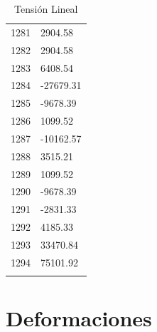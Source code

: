 \documentclass[a4paper,11pt]{article}
\begin{document}
\begin{center}
\begin{longtable}{|R{1.5cm}|R{2.5cm}|}
 1281 &      2904.58 \\
 1282 &      2904.58 \\
 1283 &      6408.54 \\
 1284 &    -27679.31 \\
 1285 &     -9678.39 \\
 1286 &      1099.52 \\
 1287 &    -10162.57 \\
 1288 &      3515.21 \\
 1289 &      1099.52 \\
 1290 &     -9678.39 \\
 1291 &     -2831.33 \\
 1292 &      4185.33 \\
 1293 &     33470.84 \\
 1294 &     75101.92 \\
\bottomrule[0.8mm]                               
\caption{Tensión Lineal}             
\end{longtable}                                  
\end{center}                                     

\newpage       

\section{Deformaciones}
\end{document}
